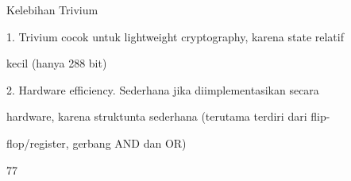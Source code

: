 \documentclass{article}
\begin{document}

Kelebihan Trivium

1. Trivium cocok untuk lightweight cryptography, karena state relatif 

kecil (hanya 288 bit)

2. Hardware efficiency. Sederhana jika diimplementasikan secara 

hardware, karena struktunta sederhana (terutama terdiri dari flip-

flop/register, gerbang AND dan OR)

77
\end{document}
